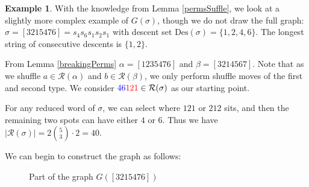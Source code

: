 \documentclass[11pt,reqno]{amsart}
\theoremstyle{definition}
\newtheorem{example}[theorem]{Example}
\theoremstyle{notation}
\newcommand{\Des}{\text{Des}}
\newcommand{\calR}{\mathcal{R}}
\begin{document}
\begin{example}
With the knowledge from Lemma \ref{permsSuffle}, we look at a slightly more complex example of $G(\sigma)$, though we do not draw the full graph: $\sigma = [3215476]=s_4s_6 s_1 s_2 s_1$ with descent set $\Des(\sigma) = \{1,2,4,6 \}$. The longest string of consecutive descents is $\{1,2\}$. 

From Lemma \ref{breakingPerms} $\alpha = [1235476]$ and $\beta = [3214567]$. Note that as we shuffle $a\in \calR(\alpha)$ and $b\in \calR(\beta)$, we only perform shuffle moves of the first and second type. We consider ${\color{blue}46}{\color{red}121}\in \calR(\sigma)$ as our starting point.

For any reduced word of $\sigma$, we can select where $121$ or $212$ sits, and then the remaining two spots can have either $4$ or $6$. Thus we have $|\calR(\sigma)| = 2\binom{5}{3} \cdot 2 =40$.

We can begin to construct the graph as follows:
\begin{figure}[H]
\begin{center}
\vspace{0.1in}
\caption{Part of the graph $G([3215476])$}
\label{fig:C4E2}
\end{center}
\end{figure}


\end{example}
\end{document}
